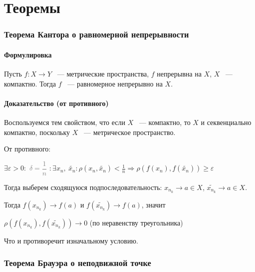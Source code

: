 \documentclass{article}
\begin{document}
\newpage
	
\part{Теоремы}

	\newpage
	
	\section{Теорема Кантора о равномерной непрерывности}
	
        \subsection{Формулировка}
        
            Пусть $f: X \rightarrow Y$ ~--- метрические пространства, $f$ непрерывна на $X$, $X$ ~--- компактно. Тогда $f$ ~--- равномерное непрерывно на $X$.
		
		\subsection{Доказательство (от противного)}
		
			Воспользуемся тем свойством, что если $X$ ~--- компактно, то $X$ и секвенциально компактно, поскольку $X$ ~--- метрическое пространство.
			
			От противного:
			
			$\exists \varepsilon > 0 : $ \textcolor{gray}{$\delta = \dfrac{1}{n}$} $ : \exists x_n, \ \widetilde{x_n} : \rho(x_n, \widetilde{x_n}) < \frac{1}{n} \Longrightarrow \rho(f(x_n), f(\widetilde{x_n})) \geq \varepsilon$
			
			Тогда выберем сходящуюся подпоследовательность: $x_{n_k} \rightarrow a \in X$, $\widetilde{x_{n_k}} \rightarrow a \in X$.
			
			Тогда $f(x_{n_k}) \rightarrow f(a)$ и $f(\widetilde{x_{n_k}}) \rightarrow f(a)$, значит
			
			$\rho(f(x_{n_k}), f(\widetilde{x_{n_k}})) \rightarrow 0$ (по неравенству треугольника)
			
			Что и противоречит изначальному условию.

	\newpage
	
	\section{Теорема Брауэра о неподвижной точке}
	
\end{document}

